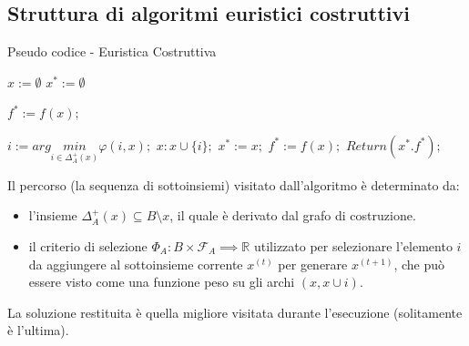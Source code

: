 \documentclass{article}
\begin{document}
    \subsection{Struttura di algoritmi euristici costruttivi}
    \begin{algorithm}[H]
        \caption{Pseudo codice - Euristica Costruttiva}
        \label{alg:cons_heu}
        \begin{algorithmic}
            \State $x:=\emptyset$
            \State $x^*:=\emptyset$

            \State $f^*:=f(x);$
            \Else
            \EndIf

            \State $i:=arg\underset{i\in\Delta_A^+(x)}{min}\varphi(i,x);$
            \State $x:x\cup\{i\};$
            \State $x^* := x;$
            \State $f^* := f(x);$
            \EndIf
            \EndWhile
            \State $Return(x^*.f^*);$
        \end{algorithmic}
    \end{algorithm}

    Il percorso (la sequenza di sottoinsiemi) visitato dall'algoritmo è determinato
    da:
    \begin{itemize}
        \item l'insieme $\Delta_A^+(x)\subseteq B\setminus x$, il quale è derivato
              dal grafo di costruzione.
        \item il criterio di selezione $\varPhi_A:B\times \mathcal{F}_A\implies\mathbb{R}$ utilizzato
              per selezionare l'elemento $i$ da aggiungere al sottoinsieme corrente $x^{(t)}$ per generare
              $x^{(t+1)}$, che può essere visto come una funzione peso su gli archi $(x,x\cup {i})$.
    \end{itemize}
    La soluzione restituita è quella migliore visitata durante l'esecuzione (solitamente è l'ultima).
\end{document}
